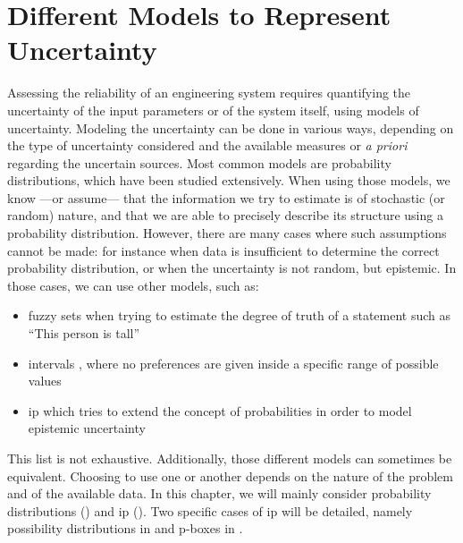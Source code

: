 \section{Different Models to Represent Uncertainty}\label{sec:different_models_of_uncertainty}
Assessing the reliability of an engineering system requires quantifying the uncertainty of the input parameters or of the system itself, using models of uncertainty. Modeling the uncertainty can be done in various ways, depending on the type of uncertainty considered and the available measures or \textit{a priori} regarding the uncertain sources. Most common models are probability distributions, which have been studied extensively. When using those models, we know —or assume— that the information we try to estimate is of stochastic (or random) nature, and that we are able to precisely describe its structure using a probability distribution. However, there are many cases where such assumptions cannot be made: for instance when data is insufficient to determine the correct probability distribution, or when the uncertainty is not random, but epistemic. In those cases, we can use other models, such as:
\begin{itemize}
    \item fuzzy sets \cite{zadeh_fuzzy_1999} when trying to estimate the degree of truth of a statement such as ``This person is tall''
    \item intervals \cite{jaulin_applied_2001}, where no preferences are given inside a specific range of possible values
    \item \acrfull{ip} which tries to extend the concept of probabilities in order to model epistemic uncertainty \cite{augustin_introduction_2014}
\end{itemize}
This list is not exhaustive. Additionally, those different models can sometimes be equivalent. Choosing to use one or another depends on the nature of the problem and of the available data. In this chapter, we will mainly consider probability distributions () and \acrshort{ip} (). Two specific cases of \acrshort{ip} will be detailed, namely possibility distributions in  and p-boxes in .

